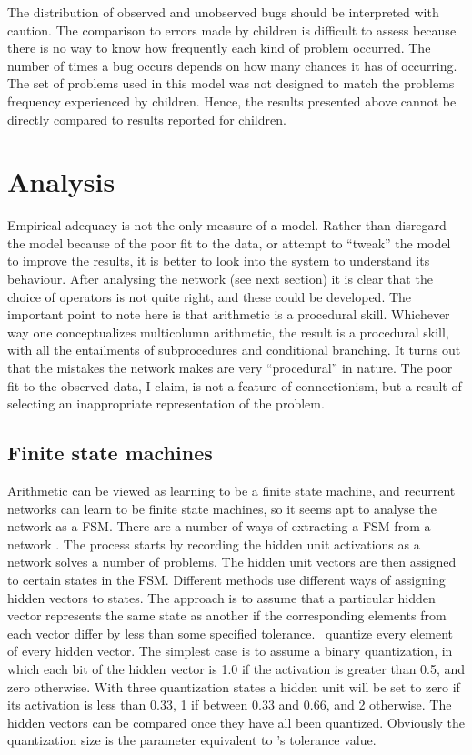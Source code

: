 The distribution of observed and unobserved bugs should be interpreted with
caution.  The comparison to errors made by children is difficult to assess
because there is no way to know how frequently each kind of problem
occurred.  The number of times a bug occurs depends on how many chances it
has of occurring.  The set of problems used in this model was not designed
to match the problems frequency experienced by children.  Hence, the
results
presented above cannot be directly compared to results reported for
children.



\section{Analysis}\label{s:multanal}

Empirical adequacy is not the only measure of a model.  Rather than
disregard the model because of the poor fit to the data, or attempt to
``tweak'' the model to improve the results, it is better to look into the
system to understand its behaviour.  After analysing the network (see next
section) it is clear that the choice of operators is not quite right, and
these could be developed.  The important point to note here is that
arithmetic is a procedural skill. Whichever way one conceptualizes
multicolumn arithmetic, the result is a procedural skill, with all the
entailments of subprocedures and conditional branching.  It turns out that
the mistakes the network makes are very ``procedural'' in nature.  The poor
fit to the observed data, I claim, is not a feature of
connectionism, but a result of selecting an inappropriate representation of
the problem.

\subsection{Finite state machines}

Arithmetic can be viewed as learning to be a finite state machine, and
recurrent networks can learn to be finite state machines, so it seems
apt to analyse the network as a FSM\@.  There are a number of ways of
extracting a FSM from a network \cite{gilelear,maskforc}.  The process
starts by recording the hidden unit activations as a network solves a
number of problems.  The hidden unit vectors are then assigned to certain
states in the FSM\@.  Different methods use different ways of assigning
hidden vectors to states.  The \citeauthor{maskforc} approach is to assume
that a particular hidden vector represents the same state as another if the
corresponding elements from each vector differ by less than some specified
tolerance.  \citeauthor{gilelear}\ quantize every element of every hidden
vector.  The simplest case is to assume a binary quantization, in which
each bit of the hidden vector is 1.0 if the activation is greater than 0.5,
and zero otherwise.  With three quantization states a hidden unit will be
set to zero if its activation is less than 0.33, 1 if between 0.33 and
0.66, and 2 otherwise.  The hidden vectors can be compared once they have
all been quantized.  Obviously the quantization size is the parameter
equivalent to \citeauthor{maskforc}'s tolerance value.

